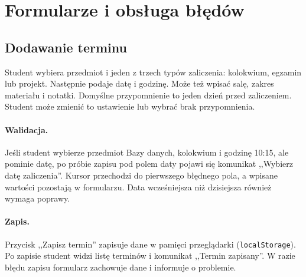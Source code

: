 \section{Formularze i obsługa błędów}\label{sec:formularze}

\subsection{Dodawanie terminu}
Student wybiera przedmiot i jeden z trzech typów zaliczenia: kolokwium,
egzamin lub projekt. Następnie podaje datę i godzinę. Może też wpisać
salę, zakres materiału i notatki. Domyślne przypomnienie to jeden dzień
przed zaliczeniem. Student może zmienić to ustawienie lub wybrać brak przypomnienia.

\paragraph{Walidacja.}
Jeśli student wybierze przedmiot Bazy danych, kolokwium i godzinę 10:15,
ale pominie datę, po próbie zapisu pod polem daty pojawi się komunikat
,,Wybierz datę zaliczenia''. Kursor przechodzi do pierwszego błędnego
pola, a wpisane wartości pozostają w formularzu. Data wcześniejsza
niż dzisiejsza również wymaga poprawy.

\paragraph{Zapis.}
Przycisk ,,Zapisz termin'' zapisuje dane w pamięci przeglądarki
(\texttt{localStorage}). Po zapisie student widzi listę terminów
i komunikat ,,Termin zapisany''. W razie błędu zapisu formularz
zachowuje dane i informuje o problemie.
